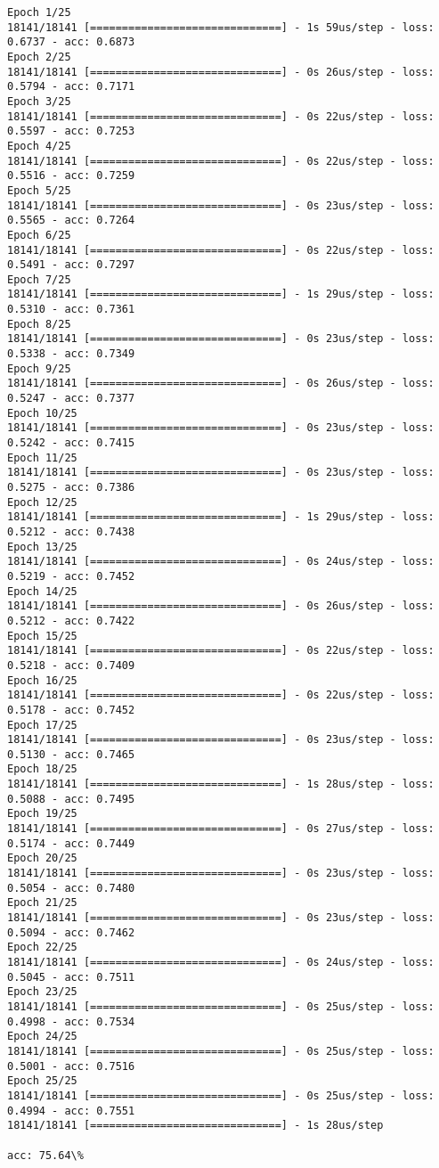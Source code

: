 \documentclass[11pt]{article}
\begin{document}
    \begin{Verbatim}[commandchars=\\\{\}]
Epoch 1/25
18141/18141 [==============================] - 1s 59us/step - loss: 0.6737 - acc: 0.6873
Epoch 2/25
18141/18141 [==============================] - 0s 26us/step - loss: 0.5794 - acc: 0.7171
Epoch 3/25
18141/18141 [==============================] - 0s 22us/step - loss: 0.5597 - acc: 0.7253
Epoch 4/25
18141/18141 [==============================] - 0s 22us/step - loss: 0.5516 - acc: 0.7259
Epoch 5/25
18141/18141 [==============================] - 0s 23us/step - loss: 0.5565 - acc: 0.7264
Epoch 6/25
18141/18141 [==============================] - 0s 22us/step - loss: 0.5491 - acc: 0.7297
Epoch 7/25
18141/18141 [==============================] - 1s 29us/step - loss: 0.5310 - acc: 0.7361
Epoch 8/25
18141/18141 [==============================] - 0s 23us/step - loss: 0.5338 - acc: 0.7349
Epoch 9/25
18141/18141 [==============================] - 0s 26us/step - loss: 0.5247 - acc: 0.7377
Epoch 10/25
18141/18141 [==============================] - 0s 23us/step - loss: 0.5242 - acc: 0.7415
Epoch 11/25
18141/18141 [==============================] - 0s 23us/step - loss: 0.5275 - acc: 0.7386
Epoch 12/25
18141/18141 [==============================] - 1s 29us/step - loss: 0.5212 - acc: 0.7438
Epoch 13/25
18141/18141 [==============================] - 0s 24us/step - loss: 0.5219 - acc: 0.7452
Epoch 14/25
18141/18141 [==============================] - 0s 26us/step - loss: 0.5212 - acc: 0.7422
Epoch 15/25
18141/18141 [==============================] - 0s 22us/step - loss: 0.5218 - acc: 0.7409
Epoch 16/25
18141/18141 [==============================] - 0s 22us/step - loss: 0.5178 - acc: 0.7452
Epoch 17/25
18141/18141 [==============================] - 0s 23us/step - loss: 0.5130 - acc: 0.7465
Epoch 18/25
18141/18141 [==============================] - 1s 28us/step - loss: 0.5088 - acc: 0.7495
Epoch 19/25
18141/18141 [==============================] - 0s 27us/step - loss: 0.5174 - acc: 0.7449
Epoch 20/25
18141/18141 [==============================] - 0s 23us/step - loss: 0.5054 - acc: 0.7480
Epoch 21/25
18141/18141 [==============================] - 0s 23us/step - loss: 0.5094 - acc: 0.7462
Epoch 22/25
18141/18141 [==============================] - 0s 24us/step - loss: 0.5045 - acc: 0.7511
Epoch 23/25
18141/18141 [==============================] - 0s 25us/step - loss: 0.4998 - acc: 0.7534
Epoch 24/25
18141/18141 [==============================] - 0s 25us/step - loss: 0.5001 - acc: 0.7516
Epoch 25/25
18141/18141 [==============================] - 0s 25us/step - loss: 0.4994 - acc: 0.7551
18141/18141 [==============================] - 1s 28us/step

acc: 75.64\%

    \end{Verbatim}
\end{document}
